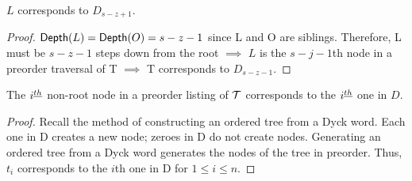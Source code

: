 \begin{remark} \label{re:L_sz1}
    $L$ corresponds to $D_{s-z+1}$.
\end{remark}
\begin{proof}

    $\mathsf{Depth}{(L)}=\mathsf{Depth}{(O)}=s-z-1$ since L and O are siblings. Therefore, L must be $s-z-1$ steps down from the root $\implies$ $L$ is the $s-j-1$th node in a preorder traversal of T $\implies$ T corresponds to $D_{s-z-1}$.


\end{proof}











\begin{remark}
    The $i^{\underline{th}}$ non-root node in a preorder listing of $\mathcal{T}$ corresponds to the $i^{\underline{th}}$ one in $D$.

\end{remark}
\begin{proof}
    Recall the method of constructing an ordered tree from a Dyck word.  Each one in D creates a new node; zeroes in D do not create nodes.  Generating an ordered tree from a Dyck word generates the nodes of the tree in preorder.  Thus, $t_i$ corresponds to the $i$th one in D for $1 \le i \le n$.
\end{proof}

